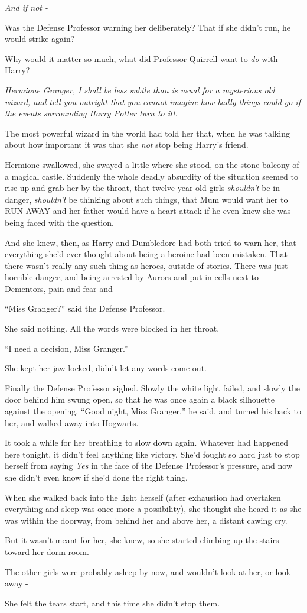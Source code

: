 \emph{And if not -}

Was the Defense Professor warning her deliberately? That if she didn't run, he would strike again?

Why would it matter so much, what did Professor Quirrell want to \emph{do} with Harry?

\emph{Hermione Granger, I shall be less subtle than is usual for a mysterious old wizard, and tell you outright that you cannot} \emph{imagine} \emph{how badly things could go if the events surrounding Harry Potter turn to ill.}

The most powerful wizard in the world had told her that, when he was talking about how important it was that she \emph{not} stop being Harry's friend.

Hermione swallowed, she swayed a little where she stood, on the stone balcony of a magical castle. Suddenly the whole deadly absurdity of the situation seemed to rise up and grab her by the throat, that twelve-year-old girls \emph{shouldn't} be in danger, \emph{shouldn't} be thinking about such things, that Mum would want her to RUN AWAY and her father would have a heart attack if he even knew she was being faced with the question.

And she knew, then, as Harry and Dumbledore had both tried to warn her, that everything she'd ever thought about being a heroine had been mistaken. That there wasn't really any such thing as heroes, outside of stories. There was just horrible danger, and being arrested by Aurors and put in cells next to Dementors, pain and fear and -

``Miss Granger?'' said the Defense Professor.

She said nothing. All the words were blocked in her throat.

``I need a decision, Miss Granger.''

She kept her jaw locked, didn't let any words come out.

Finally the Defense Professor sighed. Slowly the white light failed, and slowly the door behind him swung open, so that he was once again a black silhouette against the opening. ``Good night, Miss Granger,'' he said, and turned his back to her, and walked away into Hogwarts.

It took a while for her breathing to slow down again. Whatever had happened here tonight, it didn't feel anything like victory. She'd fought so hard just to stop herself from saying \emph{Yes} in the face of the Defense Professor's pressure, and now she didn't even know if she'd done the right thing.

When she walked back into the light herself (after exhaustion had overtaken everything and sleep was once more a possibility), she thought she heard it as she was within the doorway, from behind her and above her, a distant cawing cry.

But it wasn't meant for her, she knew, so she started climbing up the stairs toward her dorm room.

The other girls were probably asleep by now, and wouldn't look at her, or look away -

She felt the tears start, and this time she didn't stop them.
